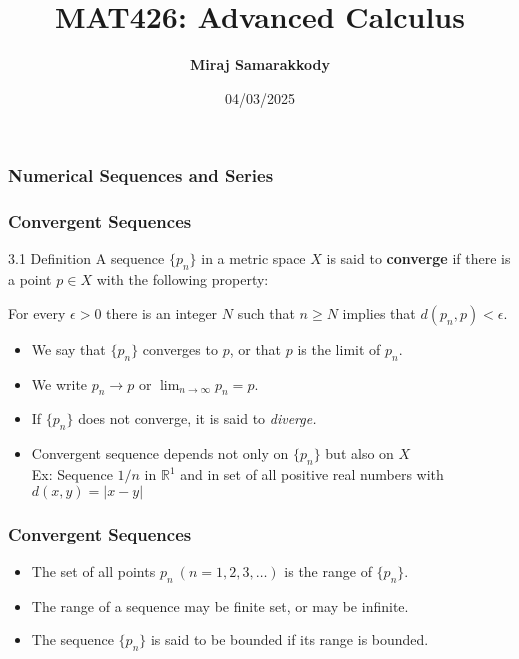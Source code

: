 \documentclass{beamer}
\title{MAT426: Advanced Calculus}
\author{\textbf{Miraj Samarakkody}}
\institute{Tougaloo College}
\date{04/03/2025}
\begin{document}
\begin{frame}
    \titlepage
\end{frame}




\begin{frame}
    \frametitle{Numerical Sequences and Series}
\end{frame}

    \begin{frame}
        \frametitle{Convergent Sequences}
    
        \begin{block}{3.1 Definition}
            A sequence \(\{p_n\}\) in a metric space \(X\) is said to \textbf{converge} if there is a point \(p \in X\) with the following property: \\
            \vspace{0.2in}

            For every \(\epsilon>0\) there is an integer \(N\) such that \(n\geq N\) implies that \(d(p_n,p) < \epsilon\). 
        \end{block} \pause 
        \begin{itemize}
            \item We say that \(\{p_n\}\) converges to \(p\), or that \(p\) is the limit of \(p_n\). \pause
            \item We write \(p_n \to p \) or \(\lim_{n \to \infty}p_n =p\). \pause
            \item If \(\{p_n\}\) does not converge, it is said to \textit{diverge.}\pause
            \item Convergent sequence depends not only on \(\{p_n\}\) but also on \(X\)\\
            Ex: Sequence \(1/n\) in \(\mathbb{R}^1\) and in set of all positive real numbers with \(d(x,y)=|x-y|\)
        \end{itemize}
    \end{frame}

\begin{frame}
    \frametitle{Convergent Sequences}

    \begin{itemize}
        \item The set of all points \(p_n~(n=1,2,3, \dots)\) is the range of \(\{p_n\}. \)
        \item The range of a sequence may be finite set, or may be infinite. 
        \item The sequence \(\{p_n\}\) is said to be bounded if its range is bounded. 
    \end{itemize}

\end{frame}
\end{document}

